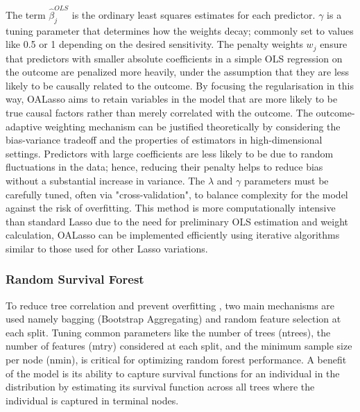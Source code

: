 \noindent The term \(\hat{\beta}_{j}^{OLS}\) is the ordinary least squares estimates for each predictor. \(\gamma\) is a tuning parameter that determines how the weights decay; commonly set to values like 0.5 or 1 depending on the desired sensitivity. The penalty weights \(w_{j}\) ensure that predictors with smaller absolute coefficients in a simple OLS regression on the outcome are penalized more heavily, under the assumption that they are less likely to be causally related to the outcome. By focusing the regularisation in this way, \parencite{shortreed_outcome-adaptive_2017} OALasso aims to retain variables in the model that are more likely to be true causal factors rather than merely correlated with the outcome. The outcome-adaptive weighting mechanism can be justified theoretically by considering the bias-variance tradeoff and the properties of estimators in high-dimensional settings. Predictors with large coefficients are less likely to be due to random fluctuations in the data; hence, reducing their penalty helps to reduce bias without a substantial increase in variance. The \(\lambda\) and \(\gamma\) parameters must be carefully tuned, often via "cross-validation", to balance complexity for the model against the risk of overfitting. This method is more computationally intensive than standard Lasso due to the need for preliminary OLS estimation and weight calculation, OALasso can be implemented efficiently using iterative algorithms \parencite{shortreed_outcome-adaptive_2017} similar to those used for other Lasso variations.

\subsubsection{Random Survival Forest}
\noindent To reduce tree correlation and prevent overfitting \parencite{pham_springer_2023}, two main mechanisms are used namely bagging (Bootstrap Aggregating) and random feature selection at each split. Tuning common parameters like the number of trees (ntrees), the number of features (mtry) considered at each split, and the minimum sample size per node (nmin), is critical for optimizing random forest performance. A benefit of the model is its ability to capture survival functions for an individual in the distribution by estimating its survival function across all trees where the individual is captured in terminal nodes. 

